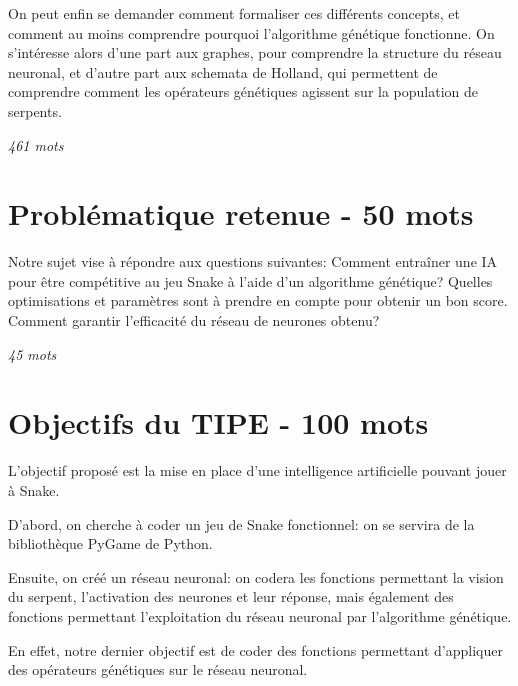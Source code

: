 \documentclass[11pt,a4paper]{article}
\begin{document}

On peut enfin se demander comment formaliser ces différents concepts, et comment au moins comprendre pourquoi l'algorithme génétique fonctionne.
On s'intéresse alors d'une part aux graphes, pour comprendre la structure du réseau neuronal, et d'autre part aux schemata de Holland, qui permettent de comprendre comment les opérateurs génétiques agissent sur la population de serpents.


\cite{davis1991handbookGeneticAlgorithms}

\textit{461 mots}

\section{Problématique retenue - 50 mots}

Notre sujet vise à répondre aux questions suivantes:
Comment entraîner une IA pour être compétitive au jeu Snake à l'aide d'un algorithme génétique?
Quelles optimisations et paramètres sont à prendre en compte pour obtenir un bon score.
Comment garantir l'efficacité du réseau de neurones obtenu?

\textit{45 mots}

\section{Objectifs du TIPE - 100 mots}

L'objectif proposé est la mise en place d'une intelligence artificielle pouvant jouer à Snake.

D'abord, on cherche à coder un jeu de Snake fonctionnel: on se servira de la bibliothèque PyGame de Python.

Ensuite, on créé un réseau neuronal: on codera les fonctions permettant la vision du serpent, l'activation des neurones et leur réponse, mais également des fonctions permettant l'exploitation du réseau neuronal par l'algorithme génétique.

En effet, notre dernier objectif est de coder des fonctions permettant d'appliquer des opérateurs génétiques sur le réseau neuronal.
\end{document}
